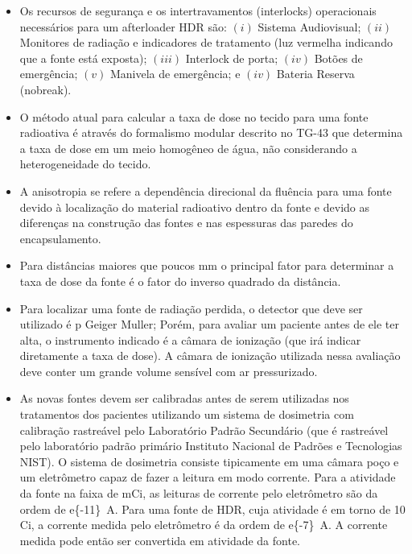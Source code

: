 \documentclass[11pt,a4paper]{article}
\newcounter{exemplo}
\begin{document}
\begin{exemplo}[8. Braquiterapia]
\begin{itemize}
        \item Os recursos de segurança e os intertravamentos (interlocks) operacionais necessários para um afterloader HDR são: $(i)$ Sistema Audiovisual; $(ii)$ Monitores de radiação e indicadores de tratamento (luz vermelha indicando que a fonte está exposta); $(iii)$ Interlock de porta;  $(iv)$ Botões de emergência; $(v)$ Manivela de emergência; e $(iv)$ Bateria Reserva (nobreak).
        
        \item O método atual para calcular a taxa de dose no tecido para uma fonte radioativa é através do formalismo modular descrito no TG-43 que determina a taxa de dose em um meio homogêneo de água, não considerando a heterogeneidade do tecido.
        
        \item A anisotropia se refere a dependência direcional da fluência para uma fonte devido à localização do material radioativo dentro da fonte e devido as diferenças na construção das fontes e nas espessuras das paredes do encapsulamento.
        
        \item Para distâncias maiores que poucos mm o principal fator para determinar a taxa de dose da fonte é o fator do inverso quadrado da distância.
        
        \item Para localizar uma fonte de radiação perdida, o detector que deve ser utilizado é p Geiger Muller; Porém, para avaliar um paciente antes de ele ter alta, o instrumento indicado é a câmara de ionização (que irá indicar diretamente a taxa de dose). A câmara de ionização utilizada nessa avaliação deve conter um grande volume sensível com ar pressurizado.
        
        \item As novas fontes devem ser calibradas antes de serem utilizadas nos tratamentos dos pacientes utilizando um sistema de dosimetria com calibração rastreável pelo Laboratório Padrão Secundário (que é rastreável pelo laboratório padrão primário Instituto Nacional de Padrões e Tecnologias NIST). O sistema de dosimetria consiste tipicamente em uma câmara poço e um eletrômetro capaz de fazer a leitura em modo corrente. Para a atividade da fonte na faixa de mCi, as leituras de corrente pelo eletrômetro são da ordem de \qty{e{-11}}{A}. Para uma fonte de HDR, cuja atividade é em torno de 10 Ci, a corrente medida pelo eletrômetro é da ordem de \qty{e{-7}}{A}. A corrente medida pode então ser convertida em atividade da fonte.
        

\end{itemize}
\end{exemplo}
\end{document}
